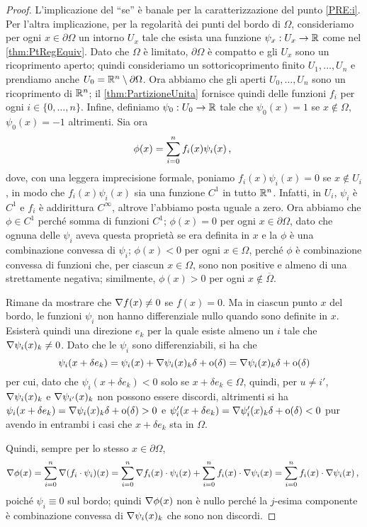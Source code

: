\begin{proof}
	L'implicazione del ``se'' è banale per la caratterizzazione del punto \ref{PRE:i}. Per l'altra implicazione, per la regolarità dei punti
	del bordo di $\Omega$, consideriamo per ogni $x\in\partial \Omega$ un intorno $U_x$ tale che esista una funzione $\psi_x:U_x\rightarrow \mathbb R$
	come nel \cref{thm:PtRegEquiv}. Dato che $\Omega$ è limitato, $\partial\Omega$ è compatto e gli $U_x$ sono un ricoprimento aperto;
	quindi consideriamo un sottoricoprimento finito $U_1, \dots, U_n$  e prendiamo anche $U_0 = \mathbb R^n \setminus \partial \Omega$.
	Ora abbiamo che gli aperti $U_0,\dots,U_n$ sono un ricoprimento di $\mathbb R^n$;
	il \cref{thm:PartizioneUnita} fornisce quindi delle funzioni $f_i$ per ogni $i\in\{0,\dots, n\}$.
	Infine, definiamo $\psi_0:U_0\rightarrow \mathbb R$ tale che $\psi_0(x)=1$ se $x\notin \Omega$, $\psi_0(x)=-1$ altrimenti. Sia ora 
	\[
		\phi(x)=\sum_{i=0}^n f_i(x) \psi_i(x)\, \text{, }
	\] %
	dove, con una leggera imprecisione formale, poniamo $f_i(x) \psi_i(x) = 0$ se $x\notin U_i$, in modo che $f_i(x) \psi_i(x)$ sia una funzione
	$C^1$ in tutto $\mathbb R^n$. Infatti, in $U_i$, $\psi_i$ è $C^1$ e $f_i$ è addirittura $C^{\infty}$, altrove l'abbiamo posta uguale a zero.
	Ora abbiamo che $\phi\in C^1$ perché somma di funzioni $C^1$; $\phi(x)=0$ per ogni $x\in \partial\Omega$, dato che ognuna delle
	$\psi_i$ aveva questa proprietà se era definita in $x$ e la $\phi$ è una combinazione convessa di $\psi_i$;
	$\phi(x)<0$ per ogni $x \in \Omega$, perché $\phi$ è combinazione convessa di funzioni che, per ciascun $x\in\Omega$, sono non positive e
	almeno di una strettamente negativa; similmente, $\phi(x)>0$ per ogni $x \notin \overline\Omega$.
	
	Rimane da mostrare che $\nabla f(x)\neq 0$ se $f(x)=0$. Ma in ciascun punto $x$ del bordo, le funzioni $\psi_i$ non hanno differenziale nullo
	quando sono definite in $x$. Esisterà quindi una direzione $e_k$ per la quale esiste almeno un $i$ tale che $\nabla \psi_i(x)_k\neq 0$. Dato che
	le $\psi_i$ sono differenziabili, si ha che
	\[
		\psi_i(x+\delta e_k)=\psi_i(x)+\nabla \psi_i(x)_k \delta + \mathrm{o}(\delta) = \nabla \psi_i(x)_k \delta + \mathrm{o}(\delta)
	\]
	per cui, dato che $\psi_i(x+\delta e_k)<0$ solo se $x+\delta e_k\in \Omega$, quindi, per $u\neq i'$, $\nabla \psi_i(x)_k$ e
	$\nabla \psi_{i'}(x)_k$ non possono essere discordi, altrimenti si ha $\psi_i(x+\delta e_k)= \nabla \psi_i(x)_k \delta + \mathrm{o}(\delta)>0$ e
	$\psi_i'(x+\delta e_k)=\nabla \psi_i'(x)_k \delta + \mathrm{o}(\delta)<0$ pur avendo in entrambi i casi
	che $x+\delta e_k$ sta in $\Omega$. %
	
	Quindi, sempre per lo stesso $x\in\partial \Omega$,
	\[ 
		\nabla \phi(x)=\sum_{i=0}^n \nabla (f_i \cdot\psi_i)(x)=\sum_{i=0}^n \nabla f_i(x)\cdot \psi_i(x)+\sum_{i=0}^n f_i(x)\cdot \nabla \psi_i(x)=
		\sum_{i=0}^n f_i(x)\cdot \nabla  \psi_i(x)\, \text{, }
	\]
	poiché $\psi_i\equiv 0$ sul bordo; quindi $\nabla \phi(x)$ non è nullo perché la $j$-esima componente è combinazione convessa di
	$\nabla \psi_i(x)_k$ che sono non discordi.
\end{proof}

